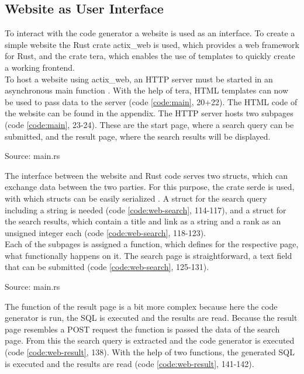 \subsection{Website as User Interface}
To interact with the code generator a website is used as an interface. To create a simple website the Rust crate actix\_web is used, which provides a web framework for Rust, and the crate tera, which enables the use of templates to quickly create a working frontend.\\
To host a website using actix\_web, an HTTP server must be started in an asynchronous main function \parencite[cf.][n.p.]{ede_actix_2022}. With the help of tera, HTML templates can now be used \parencite[cf.][n.p.]{prouillet_tera_2022} to pass data to the server (code \ref{code:main}, 20+22). The HTML code of the website can be found in the appendix. The HTTP server hosts two subpages (code \ref{code:main}, 23-24). These are the start page, where a search query can be submitted, and the result page, where the search results will be displayed.
\begin{codeenv}
    \label{code:main}
    
    \centerline{Source: main.rs}
\end{codeenv}
The interface between the website and Rust code serves two structs, which can exchange data between the two parties. For this purpose, the crate serde is used, with which structs can be easily serialized \parencite[cf.][n.p.]{tolnay_serde_2017}. A struct for the search query including a string is needed (code \ref{code:web-search}, 114-117), and a struct for the search results, which contain a title and link as a string and a rank as an unsigned integer each (code \ref{code:web-search}, 118-123).\\
Each of the subpages is assigned a function, which defines for the respective page, what functionally happens on it. The search page is straightforward, a text field that can be submitted (code \ref{code:web-search}, 125-131).
\begin{codeenv}
    \label{code:web-search}
    
    \centerline{Source: main.rs}
\end{codeenv}
The function of the result page is a bit more complex because here the code generator is run, the \ac{SQL} is executed and the results are read. Because the result page resembles a POST request the function is passed the data of the search page. From this the search query is extracted and the code generator is executed (code \ref{code:web-result}, 138). With the help of two functions, the generated \ac{SQL} is executed and the results are read (code \ref{code:web-result}, 141-142).\\
